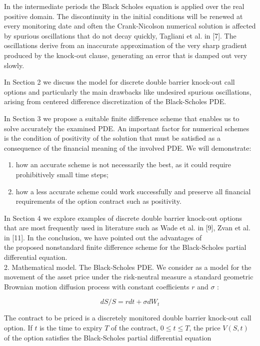 \documentclass[10pt]{article}
\begin{document}
In the intermediate periods the Black Scholes equation is applied over the real positive domain. The discontinuity in the initial conditions will be renewed at every monitoring date and often the Crank-Nicolson numerical solution is affected by spurious oscillations that do not decay quickly, Tagliani et al. in [7]. The oscillations derive from an inaccurate approximation of the very sharp gradient produced by the knock-out clause, generating an error that is damped out very slowly.

In Section 2 we discuss the model for discrete double barrier knock-out call options and particularly the main drawbacks like undesired spurious oscillations, arising from centered difference discretization of the Black-Scholes PDE.

In Section 3 we propose a suitable finite difference scheme that enables us to solve accurately the examined PDE. An important factor for numerical schemes is the condition of positivity of the solution that must be satisfied as a consequence of the financial meaning of the involved PDE. We will demonstrate:

\begin{enumerate}
  \item how an accurate scheme is not necessarily the best, as it could require prohibitively small time steps;
  \item how a less accurate scheme could work successfully and preserve all financial requirements of the option contract such as positivity.
\end{enumerate}

In Section 4 we explore examples of discrete double barrier knock-out options that are most frequently used in literature such as Wade et al. in [9], Zvan et al. in [11]. In the conclusion, we have pointed out the advantages of\\
the proposed nonstandard finite difference scheme for the Black-Scholes partial differential equation.\\
2. Mathematical model. The Black-Scholes PDE. We consider as a model for the movement of the asset price under the risk-neutral measure a standard geometric Brownian motion diffusion process with constant coefficients $r$ and $\sigma$ :


\begin{equation*}
d S / S=r d t+\sigma d W_{t} \tag{1}
\end{equation*}


The contract to be priced is a discretely monitored double barrier knock-out call option. If $t$ is the time to expiry $T$ of the contract, $0 \leq t \leq T$, the price $V(S, t)$ of the option satisfies the Black-Scholes partial differential equation
\end{document}
